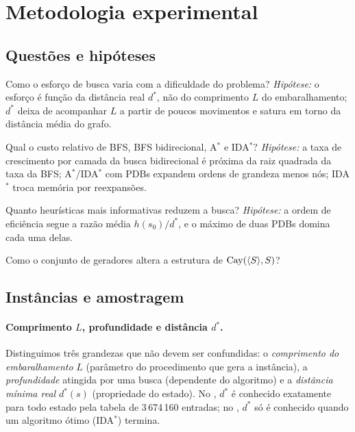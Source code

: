 \section{Metodologia experimental}\label{sec:metodologia}

\subsection{Questões e hipóteses}
\begin{description}[nosep,leftmargin=1.2em]
\item[Q1 (crescimento).] Como o esforço de busca varia com a dificuldade do problema? \emph{Hipótese:} o esforço é função da distância real $d^*$, não do comprimento $L$ do embaralhamento; $d^*$ deixa de acompanhar $L$ a partir de poucos movimentos e satura em torno da distância média do grafo.
\item[Q2 (algoritmos).] Qual o custo relativo de BFS, BFS bidirecional, A$^*$ e IDA$^*$? \emph{Hipótese:} a taxa de crescimento por camada da busca bidirecional é próxima da raiz quadrada da taxa da BFS; A$^*$/IDA$^*$ com PDBs expandem ordens de grandeza menos nós; IDA$^*$ troca memória por reexpansões.
\item[Q3 (heurísticas).] Quanto heurísticas mais informativas reduzem a busca? \emph{Hipótese:} a ordem de eficiência segue a razão média $h(s_0)/d^*$, e o máximo de duas PDBs domina cada uma delas.
\item[Q4 (estrutura).] Como o conjunto de geradores altera a estrutura de $\operatorname{Cay}(\langle S\rangle,S)$?
\end{description}

\subsection{Instâncias e amostragem}
\paragraph{Comprimento $L$, profundidade e distância $d^*$.} Distinguimos três grandezas que não devem ser confundidas: o \emph{comprimento do embaralhamento} $L$ (parâmetro do procedimento que gera a instância), a \emph{profundidade} atingida por uma busca (dependente do algoritmo) e a \emph{distância mínima real} $d^*(s)$ (propriedade do estado). No , $d^*$ é conhecido exatamente para todo estado pela tabela de 3\,674\,160 entradas; no , $d^*$ só é conhecido quando um algoritmo ótimo (IDA$^*$) termina.

